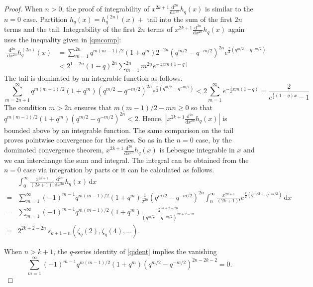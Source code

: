 \documentclass[10pt,a4paper]{amsart}
\newcommand{\dd}{\mathrm{d}}
\renewcommand{\geq}{\geqslant}
\begin{document}
\begin{proof}
When $n>0$, the proof of integrability of $x^{2k+1} \frac{\dd^{2n}}{\dd x^{2n}} h_q(x)$ is similar to the $n=0$ case.  Partition $h_q(x)=h_q^{(2n)}(x)+$ tail into the sum of the first $2n$ terms and the tail. Integrability of the first $2n$ terms of $x^{2k+1} \frac{\dd^{2n}}{\dd x^{2n}} h_q(x)$ again uses the inequality given in \cref{qmcomp}:
\begin{align*}
\frac{\dd^{2n}}{\dd x^{2n}} h_q^{(2n)}(x) 
&= \sum_{m=1}^{2n} q^{m(m-1)/2}(1+q^m)2^{-2n} \left(q^{m/2}-q^{-m/2}\right)^{2n}e^{\frac{x}{2} (q^{m/2}-q^{-m/2})} \\
&< 2^{1-2n}(1-q)^{2n}\sum_{m=1}^{2n} m^{2n}e^{-\frac{1}{2}xm(1-q)}
\end{align*}
The tail is dominated by an integrable function as follows.
\[
\sum_{m=2n+1}^\infty q^{m(m-1)/2}(1+q^m) (q^{m/2}-q^{-m/2})^{2n}e^{\frac{x}{2}\left(q^{m/2}-q^{-m/2}\right)} < 2\sum_{m=1}^\infty e^{-\frac{1}{2}xm(1-q)}=\frac{2}{e^{\frac{1}{2}(1-q)x}-1}
\]
The condition $m>2n$ ensures that $m(m-1)/2-mn\geq0$ so that $q^{m(m-1)/2}(1+q^m)\left(q^{m/2}-q^{-m/2}\right)^{2n}<2$. Hence, $\left| x^{2k+1} \frac{\dd^{2n}}{\dd x^{2n}} h_q(x) \right|$ is bounded above by an integrable function.
The same comparison on the tail proves pointwise convergence for the series. So as in the $n=0$ case, by the dominated convergence theorem, $x^{2k+1} \frac{\dd^{2n}}{\dd x^{2n}} h_q(x)$ is Lebesgue integrable in $x$ and we can interchange the sum and integral. The integral can be obtained from the $n=0$ case via integration by parts or it can be calculated as follows.
\begin{align*} 
& \int_0^\infty \!\! \frac{x^{2k+1}}{(2k+1)!} \frac{\dd^{2n}}{\dd x^{2n}} h_q(x) \, \dd x \\
={}& \sum_{m=1}^\infty (-1)^{m-1}q^{m(m-1)/2}(1+q^m)\tfrac{1}{2^{2n}} (q^{m/2}-q^{-m/2})^{2n} \int_0^\infty \!\! \frac{x^{2k+1}}{(2k+1)!}e^{\frac{x}{2}(q^{m/2}-q^{-m/2})} \, \dd x \\
={}& \sum_{m=1}^\infty (-1)^{m-1}q^{m(m-1)/2}(1+q^m)\frac{ 2^{2k+2-2n}}{(q^{m/2}-q^{-m/2})^{2k+2-2n}} \\
={}& 2^{2k+2-2n} \, s_{k+1-n}\left(\zeta_q(2), \zeta_q(4), \ldots \right).
\end{align*} 


When $n>k+1$, the $q$-series identity of \cref{qident} implies the vanishing
\[
\sum_{m=1}^\infty (-1)^{m-1}q^{m(m-1)/2}(1+q^m)(q^{m/2}-q^{-m/2})^{2n-2k-2} = 0.
\]



\end{proof}
\end{document}
